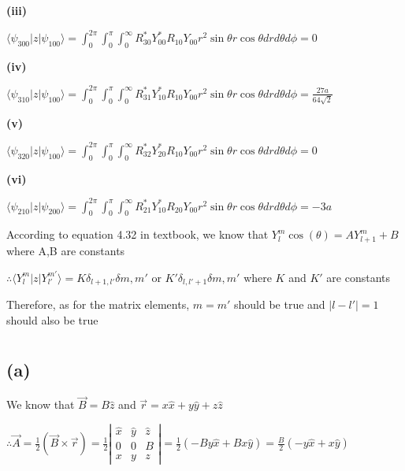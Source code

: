 \documentclass[12pt]{article}
\begin{document}
\begin{spacing}{2.0}
\textbf{(iii)}

$\langle \psi_{300}|z|\psi_{100} \rangle = \int_{0}^{2\pi} \int_{0}^{\pi} \int_{0}^{\infty} R^{*}_{30}Y^{*}_{00}R_{10}Y_{00} r^2 \sin \theta r \cos \theta dr d\theta d\phi=0$

\textbf{(iv)}

$\langle \psi_{310}|z|\psi_{100} \rangle = \int_{0}^{2\pi} \int_{0}^{\pi} \int_{0}^{\infty} R^{*}_{31}Y^{*}_{10}R_{10}Y_{00} r^2 \sin \theta r \cos \theta dr d\theta d\phi=\frac{27 a}{64 \sqrt{2}}$

\textbf{(v)}

$\langle \psi_{320}|z|\psi_{100} \rangle = \int_{0}^{2\pi} \int_{0}^{\pi} \int_{0}^{\infty} R^{*}_{32}Y^{*}_{20}R_{10}Y_{00} r^2 \sin \theta r \cos \theta dr d\theta d\phi=0$

\textbf{(vi)}

$\langle \psi_{210}|z|\psi_{200} \rangle = \int_{0}^{2\pi} \int_{0}^{\pi} \int_{0}^{\infty} R^{*}_{21}Y^{*}_{10}R_{20}Y_{00} r^2 \sin \theta r \cos \theta dr d\theta d\phi=-3 a$

According to equation 4.32 in textbook, we know that $Y_l^m \cos(\theta)= AY_{l+1}^m+B$ where A,B are constants

$\therefore \langle Y_l^m|z|Y_{l'}^{m'} \rangle = K\delta_{l+1,l'}\delta{m,m'}$ or $K'\delta_{l,l'+1}\delta{m,m'}$ where $K$ and $K'$ are constants

Therefore, as for the matrix elements, $m=m'$ should be true and $|l-l'|=1$ should also be true

\section{} %

\subsection*{(a)}

We know that $\vec{B}= B\hat{z}$ and $\vec{r}= x\hat{x}+ y\hat{y}+z\hat{z}$

$\therefore \vec{A}=\frac{1}{2} \left( \vec{B} \times \vec{r} \right) = \frac{1}{2} \left| 
\begin{array}{ccc}
\hat{x} & \hat{y} & \hat{z} \\
0 & 0 & B \\
x & y & z
\end{array}
\right|= \frac{1}{2} \left(-By \hat{x}+ Bx\hat{y} \right)= \frac{B}{2}(-y \hat{x}+x\hat{y})$


\end{spacing}
\end{document}
